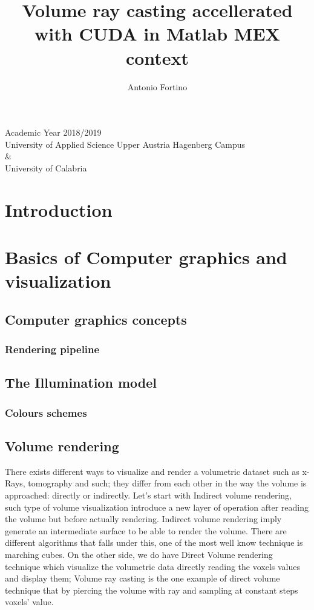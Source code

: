 \documentclass[10pt,a4paper]{article}
\author{Antonio Fortino}
\title{Volume ray casting accellerated with CUDA in Matlab MEX context}
\begin{document}
\maketitle
\begin{center}
Academic Year 2018/2019\\
University of Applied Science Upper Austria Hagenberg Campus\\
\&\\
University of Calabria
\end{center}
\pagebreak
\tableofcontents
\pagebreak
\section{Introduction}

\section{Basics of Computer graphics and visualization}
\subsection{Computer graphics concepts}
\subsubsection{Rendering pipeline}
\subsection{The Illumination model}
\subsubsection{Colours schemes}
\subsection{Volume rendering}
There exists different ways to visualize and render a volumetric dataset such as x-Rays, tomography and such; they differ from each other in the way the volume is approached: directly or indirectly.
Let's start with Indirect volume rendering, such type of volume visualization introduce a new layer of operation after reading the volume but before actually rendering. Indirect volume rendering imply generate an intermediate surface to be able to render the volume. There are different algorithms that falls under this, one of the most well know technique is marching cubes.
On the other side, we do have Direct Volume rendering technique which visualize the volumetric data directly reading the voxels values and display them; Volume ray casting is the one example of direct volume technique that by piercing the volume with ray and sampling at constant steps voxels' value.
\end{document}
